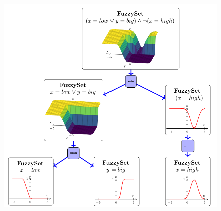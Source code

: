 \documentclass[
	10pt,
	t		%
]{beamer}
\begin{document}
\begin{frame}
	\vspace{0cm}
	\begin{figure}
		\centering
		\includegraphics[height=0.62\paperwidth]{figures/RecursiveFuzzyTree.png}
	\end{figure}
\end{frame}
\end{document}
